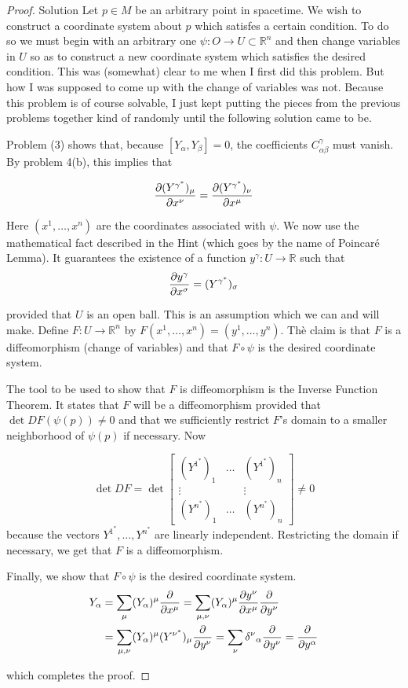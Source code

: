\begin{proof}
    Solution Let $p\in M$ be an arbitrary point in spacetime. We wish to construct a
    coordinate system about $p$ which satisfes a certain condition. To do so we must begin with an arbitrary one $\psi:O\longrightarrow U\subset\mathbb{R}^n$ and then change variables in $U$ so as to construct a new coordinate system which satisfies the desired condition. This was (somewhat) clear to me when I first did this problem. But how I was supposed to come up with the change of variables was not. Because this problem is of course solvable, I just kept putting the pieces from the previous problems together kind of randomly until the following solution came to be.
   
    Problem (3) shows that, because $[Y_\alpha,Y_\beta]=0$, the coefficients $C^\gamma_{\alpha\beta}$ must vanish. By problem 4(b), this implies that
   
   \[
   \pdv{(Y^{\gamma^*})_\mu}{x^\nu}=\pdv{(Y^{\gamma^*})_\nu}{x^\mu}
   \]
   
    Here $( x^1, \ldots , x^n) $ are the coordinates associated with $\psi.$ We now use the mathematical fact described in the Hint (which goes by the name of Poincaré Lemma). It guarantees the existence of a function $y^\gamma:U\longrightarrow\mathbb{R}$ such that
    \[\pdv{y^\gamma}{x^\sigma}=(Y^{\gamma^*})_\sigma\]
   
    provided that $U$ is an open ball. This is an assumption which we can and will make. Define $F:U\longrightarrow\mathbb{R}^n$ by $F(x^1,\ldots,x^n)=(y^1,\ldots,y^n)$. Thè claim is that $F$ is a diffeomorphism (change of variables) and that $F\circ\psi$ is the desired coordinate system.
   
    The tool to be used to show that $F$ is diffeomorphism is the Inverse Function Theorem. It states that $F$ will be a diffeomorphism provided that $\det DF(\psi(p))\neq0$ and that we sufficiently restrict $F$'s domain to a smaller neighborhood of $\psi(p)$ if necessary. Now
   
    \[\operatorname*{det}DF=\operatorname*{det}\begin{bmatrix}
        (Y^{1^*})_1 & \ldots & (Y^{1^*})_n\\
        \vdots & & \vdots\\
        (Y^{n^*})_1 & \ldots & (Y^{n^*})_n
    \end{bmatrix}\neq 0\]
    because the vectors $Y^{1^*},\ldots,Y^{n^*}$ are linearly independent. Restricting the domain if necessary, we get that $F$ is a diffeomorphism.
   
    Finally, we show that $F\circ\psi$ is the desired coordinate system.
   \[\begin{aligned}
        Y_\alpha&=\sum_\mu(Y_\alpha)^\mu\pdv{}{x^\mu}=\sum_{\mu,\nu}(Y_\alpha)^\mu\pdv{y^\nu}{x^\mu}\pdv{}{y^\nu}\\
        &=\sum_{\mu,\nu}(Y_\alpha)^\mu(Y^{\nu^*})_\mu\pdv{}{y^\nu}=\sum_\nu\delta^\nu{}_\alpha\pdv{}{y^\nu}=\pdv{}{y^\alpha}
    \end{aligned}\]

    which completes the proof.
\end{proof}\newpage

